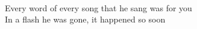 \\
Every word of every song that he sang was for you \\
In a flash he was gone, it happened so soon \\
